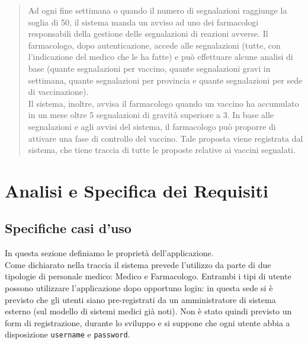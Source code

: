 \documentclass[11pt]{article}
\begin{document}
\begin{quotation}
            Ad ogni fine settimana o quando il numero di segnalazioni raggiunge la soglia di 50, il sistema manda un avviso ad uno dei farmacologi responsabili della gestione delle segnalazioni di reazioni avverse. Il farmacologo, dopo autenticazione, accede alle segnalazioni (tutte, con l'indicazione del medico che le ha fatte) e può effettuare alcune analisi di base (quante segnalazioni per vaccino, quante segnalazioni gravi in settimana, quante segnalazioni per provincia e quante segnalazioni per sede di vaccinazione).\\ Il sistema, inoltre, avvisa il farmacologo quando un vaccino ha accumulato in un mese oltre 5 segnalazioni di gravità superiore a 3.
            In base alle segnalazioni e agli avvisi del sistema, il farmacologo può proporre di attivare una fase di controllo del vaccino. Tale proposta viene registrata dal sistema, che tiene traccia di tutte le proposte relative ai vaccini segnalati.
        \end{quotation}
    \section{Analisi e Specifica dei Requisiti}
        \subsection{Specifiche casi d'uso}
        In questa sezione definiamo le proprietà dell'applicazione.\\
        Come dichiarato nella traccia il sistema prevede l'utilizzo da parte di due tipologie di personale medico: Medico e Farmacologo. 
        Entrambi i tipi di utente possono utilizzare l'applicazione dopo opportuno login: in questa sede si è previsto che gli utenti siano pre-registrati da un amministratore di sistema esterno (sul modello di sistemi medici già noti). Non è stato quindi previsto un form di registrazione, durante lo sviluppo e si suppone che ogni utente abbia a disposizione \texttt{username} e \texttt{password}.
\end{document}
